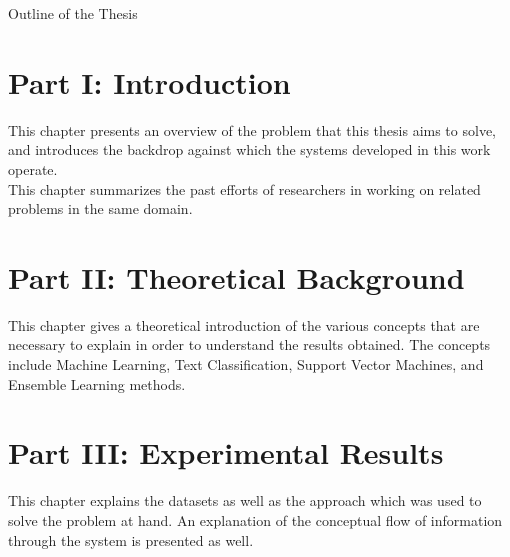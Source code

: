 \clearemptydoublepage

{}

\begin{center}
    \huge{Outline of the Thesis}
\end{center}

\section*{Part I: Introduction}

  \vspace{1mm}
\noindent This chapter presents an overview of the problem that this thesis aims to solve, and introduces the backdrop against which the systems developed in this work operate.\\

  \vspace{1mm}
\noindent This chapter summarizes the past efforts of researchers in working on related problems in the same domain.\\

\section*{Part II: Theoretical Background}

  \vspace{1mm}
\noindent This chapter gives a theoretical introduction of the various concepts that are necessary to explain in order to understand the results obtained. The concepts include Machine Learning, Text Classification, Support Vector Machines, and Ensemble Learning methods.\\

\section*{Part III: Experimental Results}
  \vspace{1mm}
\noindent This chapter explains the datasets as well as the approach which was used to solve the problem at hand. An explanation of the conceptual flow of information through the system is presented as well.\\

